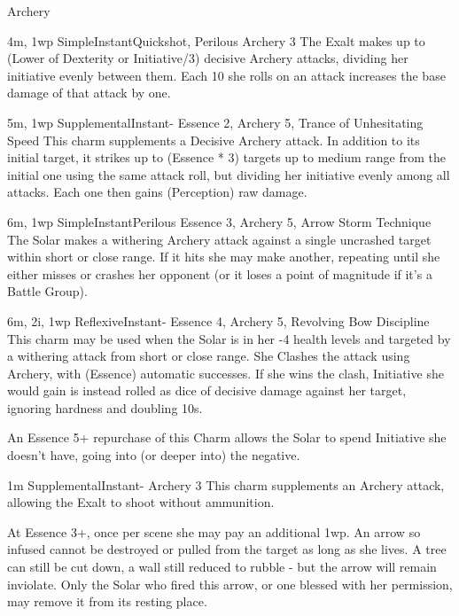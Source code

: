 \begin{Ability}{Archery}

  {4m, 1wp}
  {Simple}{Instant}{Quickshot, Perilous}
  {Archery 3}
  The Exalt makes up to (Lower of Dexterity or Initiative/3) decisive Archery attacks, dividing her initiative evenly between them. Each 10 she rolls on an attack increases the base damage of that attack by one.

  {5m, 1wp}
  {Supplemental}{Instant}{-}
  {Essence 2, Archery 5, Trance of Unhesitating Speed}
  This charm supplements a Decisive Archery attack. In addition to its initial target, it strikes up to (Essence * 3) targets up to medium range from the initial one using the same attack roll, but dividing her initiative evenly among all attacks. Each one then gains (Perception) raw damage.

  {6m, 1wp}
  {Simple}{Instant}{Perilous}
  {Essence 3, Archery 5, Arrow Storm Technique}
  The Solar makes a withering Archery attack against a single uncrashed target within short or close range. If it hits she may make another, repeating until she either misses or crashes her opponent (or it loses a point of magnitude if it's a Battle Group).

  {6m, 2i, 1wp}
  {Reflexive}{Instant}{-}
  {Essence 4, Archery 5, Revolving Bow Discipline}
  This charm may be used when the Solar is in her -4 health levels and targeted by a withering attack from short or close range. She Clashes the attack using Archery, with (Essence) automatic successes. If she wins the clash, Initiative she would gain is instead rolled as dice of decisive damage against her target, ignoring hardness and doubling 10s.

  An Essence 5+ repurchase of this Charm allows the Solar to spend Initiative she doesn't have, going into (or deeper into) the negative.

  {1m}
  {Supplemental}{Instant}{-}
  {Archery 3}
  This charm supplements an Archery attack, allowing the Exalt to shoot without ammunition.

  At Essence 3+, once per scene she may pay an additional 1wp. An arrow so infused cannot be destroyed or pulled from the target as long as she lives. A tree can still be cut down, a wall still reduced to rubble - but the arrow will remain inviolate. Only the Solar who fired this arrow, or one blessed with her permission, may remove it from its resting place.


\end{Ability}
